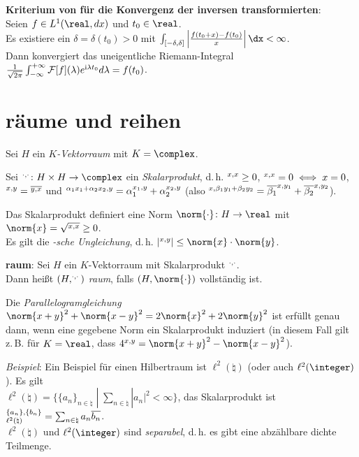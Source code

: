 \textbf{Kriterium von  für die Konvergenz der inversen
transformierten}:\\
Seien $f \in L^1(\real, dx)$ und $t_0 \in \real$.\\
Es existiere ein $\delta = \delta(t_0) > 0$ mit
$\int_{[-\delta, \delta]}
\left|\frac{f(t_0 + x) - f(t_0)}{x}\right| \dx < \infty$.\\
Dann konvergiert das uneigentliche Riemann-Integral
$\frac{1}{\sqrt{2\pi}}
\int_{-\infty}^{+\infty} \mathcal{F}[f](\lambda) e^{\mathrm{i} \lambda t_0} d\lambda = f(t_0)$.

\pagebreak

\section{%
    räume und reihen%
}

Sei $H$ ein \emph{$K$-Vektorraum} mit $K = \complex$.

Sei $\sp{\cdot, \cdot}\colon H \times H \rightarrow \complex$
ein \emph{Skalarprodukt}, d.\,h.
$\sp{x, x} \ge 0$,
$\sp{x, x} = 0 \iff x = 0$,
$\sp{x, y} = \overline{\sp{y, x}}$ und
$\sp{\alpha_1 x_1 + \alpha_2 x_2, y} =
\alpha_1 \sp{x_1, y} + \alpha_2 \sp{x_2, y}$
(also $\sp{x, \beta_1 y_1 + \beta_2 y_2} =
\overline{\beta_1} \sp{x, y_1} + \overline{\beta_2} \sp{x, y_2}$).

Das Skalarprodukt definiert eine Norm $\norm{\cdot}\colon H \rightarrow \real$
mit $\norm{x} = \sqrt{\sp{x, x}} \ge 0$.\\
Es gilt die \emph{-sche Ungleichung}, d.\,h.
$|\sp{x, y}| \le \norm{x} \cdot \norm{y}$.

\textbf{raum}:
Sei $H$ ein $K$-Vektorraum mit Skalarprodukt $\sp{\cdot, \cdot}$.\\
Dann heißt $(H, \sp{\cdot, \cdot})$ \emph{raum}, falls
$(H, \norm{\cdot})$ vollständig ist.

Die \emph{Parallelogramgleichung}
$\norm{x + y}^2 + \norm{x - y}^2 = 2 \norm{x}^2 + 2 \norm{y}^2$ ist
erfüllt genau dann, wenn eine gegebene Norm ein Skalarprodukt induziert
(in diesem Fall gilt z.\,B. für $K = \real$, dass
$4 \sp{x, y} = \norm{x + y}^2 - \norm{x - y}^2$).

\linie

\emph{Beispiel}:
Ein Beispiel für einen Hilbertraum ist
$\ell^2(\natural)$ (oder auch $\ell^2(\integer)$).
Es gilt\\
$\ell^2(\natural) = \{\{a_n\}_{n \in \natural} \;|\;
\sum_{n \in \natural} |a_n|^2 < \infty\}$,
das Skalarprodukt ist
$\sp{\{a_n\}, \{b_n\}}_{\ell^2(\natural)} =
\sum_{n \in \natural} a_n \overline{b_n}$.\\
$\ell^2(\natural)$ und $\ell^2(\integer)$ sind \emph{separabel}, d.\,h.
es gibt eine abzählbare dichte Teilmenge.

